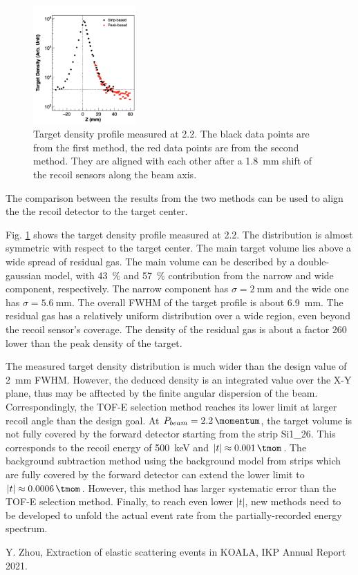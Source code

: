 \documentclass[fleqn,twocolumn,a4paper]{ikpar}
\begin{document}
\begin{figure}[t!]
  \centering
	\includegraphics[width=0.35\textwidth]{./target_density_result.png}
  \caption{Target density profile measured at \SI{2.2}{\momentum}. The black
    data points are from the first method, the red data points are from the
    second method. They are aligned with each other after a \SI{1.8}{\mm} shift of
    the recoil sensors along the beam axis.}
  \label{fig:target_density_result}
\end{figure}
The comparison between the results from the two methods can be used to align the the recoil detector to the target center.

\par
\medskip

Fig. \ref{fig:target_density_result} shows the target density profile measured at
\SI{2.2}{\momentum}.
The distribution is almost symmetric with respect to the target center.
The main target volume lies above a wide spread of residual gas.
The main volume can be described by a double-gaussian model, with
\SI{43}{\percent} and \SI{57}{\percent} contribution from the narrow and wide
component, respectively.
The narrow component has $\sigma = \SI{2}{\mm}$ and the wide one has $\sigma = \SI{5.6}{\mm}$.
The overall FWHM of the target profile is about \SI{6.9}{mm}.
The residual gas has a relatively uniform distribution over a wide region, even
beyond the recoil sensor's coverage.
The density of the residual gas is about a factor 260 lower than the peak density of the target.

\par
\medskip

The measured target density distribution is much wider than the design value of \SI{2}{\mm} FWHM.
However, the deduced density is an integrated value over the X-Y plane, thus
may be afftected by the finite angular dispersion of the beam.
Correspondingly, the TOF-E selection method reaches its lower limit at larger recoil angle than the design goal.
At $P_{beam}=\SI{2.2}{\momentum}$, the target volume is not fully covered by
the forward detector starting from the strip Si1\_26.
This corresponds to the recoil energy of \SI{500}{\keV} and $|t| \approx \SI{0.001}{\tmom}$.
The background subtraction method using the background model from strips which
are fully covered by the forward detector can extend the lower limit to $|t| \approx \SI{0.0006}{\tmom}$.
However, this method has larger systematic error than the TOF-E selection method.
Finally, to reach even lower $|t|$, new methods need to be developed to unfold the
actual event rate from the partially-recorded energy spectrum.

\par
\medskip

\begin{thebibliography}{99}
 Y. Zhou, Extraction of elastic scattering events in KOALA, IKP Annual Report 2021.
\end{thebibliography}
\end{document}
